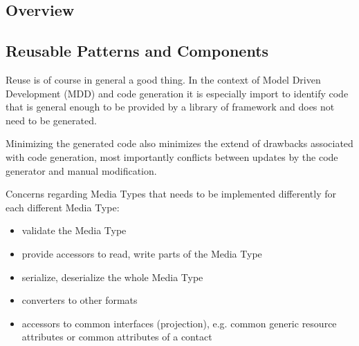\documentclass[12pt,a4paper]{scrartcl}		%
\newcommand{\citeurl}[2]{\url{#1} (#2)}
\begin{document}



\subsection{Overview}

\subsection{Reusable Patterns and Components}

Reuse is of course in general a good thing. In the context of Model Driven
Development (MDD) and code generation it is especially import to identify code
that is general enough to be provided by a library of framework and does not
need to be generated.

Minimizing the generated code also minimizes the extend of drawbacks associated
with code generation, most importantly conflicts between updates by the code
generator and manual modification.




Concerns regarding Media Types that needs to be implemented differently for each different Media Type:
\begin{itemize}
\item validate the Media Type
\item provide accessors to read, write parts of the Media Type
\item serialize, deserialize the whole Media Type
\item converters to other formats
\item accessors to common interfaces (projection), e.g. common generic resource attributes or common attributes of a contact
\end{itemize}
\end{document}
